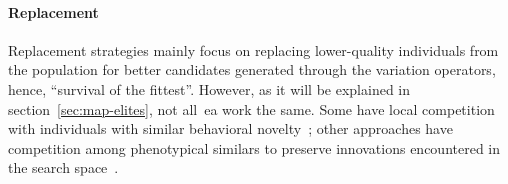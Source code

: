 \paragraph{Replacement}

Replacement strategies mainly focus on replacing lower-quality individuals from the population for better candidates generated through the variation operators, hence, ``survival of the fittest''. However, as it will be explained in section~\ref{sec:map-elites}, not all~\acrshort{ea} work the same. Some have local competition with individuals with similar behavioral novelty~\cite{lehman_evolving_2011}; other approaches have competition among phenotypical similars to preserve innovations encountered in the search space~\cite{stanley_evolving_2002}.






